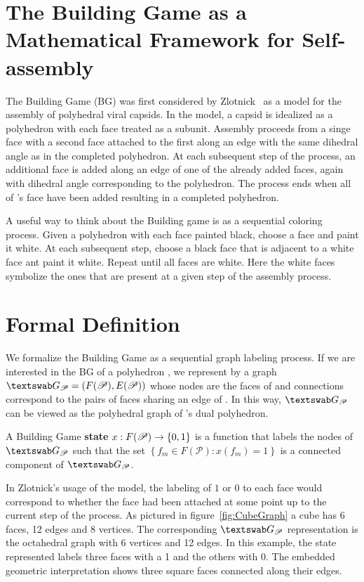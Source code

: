 \section{The Building Game as a Mathematical Framework for Self-assembly}

The Building Game (BG) was first considered by Zlotnick~\cite{Zlotnick1994} as a model for the assembly of polyhedral viral capsids. In the model, a capsid is idealized as a polyhedron \poly\spc with each face treated as a subunit. Assembly proceeds from a singe face with a second face attached to the first along an edge with the same dihedral angle as in the completed polyhedron. At each subsequent step of the process, an additional face is added along an edge of one of the already added faces, again with dihedral angle corresponding to the polyhedron. The process ends when all of \poly's face have been added resulting in a completed polyhedron.

A useful way to think about the Building game is as a sequential coloring process. Given a polyhedron with each face painted black, choose a face and paint it white. At each subsequent step, choose a black face that is adjacent to a white face ant paint it white. Repeat until all faces are white. Here the white faces symbolize the ones that are present at a given step of the assembly process.

\section{Formal Definition}
We formalize the Building Game as a sequential graph labeling process. If we are interested in the BG of a polyhedron \poly, we represent \poly\spc by a graph $\PolyGraph = \left(F(\Poly), E(\Poly)\right)$ whose nodes are the faces of \poly\spc and connections correspond to the pairs of faces sharing an edge of \poly. In this way, $\PolyGraph$ can be viewed as the polyhedral graph of \poly's dual polyhedron. 
\begin{mydef}
A Building Game \textbf{state} $x: F(\mathscr{P}) \to \{0,1\}$ is a function that labels the nodes of $\PolyGraph$ such that the set $\left\{f_m \in F\left(\mathscr{P}\right) : x\left(f_m\right) = 1\right\}$ is a connected component of $\PolyGraph$.
\end{mydef} 
In Zlotnick's usage of the model, the labeling of $1$ or $0$ to each face would correspond to whether the face had been attached at some point up to the current step of the process. As pictured in figure~\ref{fig:CubeGraph} a cube has 6 faces, 12 edges and 8 vertices. The corresponding $\PolyGraph$ representation is the octahedral graph with 6 vertices and 12 edges. In this example, the state represented labels three faces with a 1 and the others with 0. The embedded geometric interpretation shows three square faces connected along their edges.

